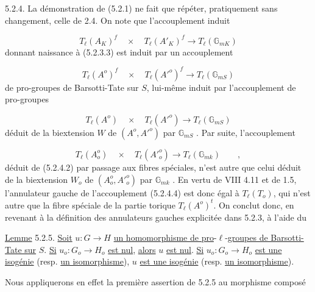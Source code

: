 5.2.4.  La démonstration de (5.2.1) ne fait que répéter, pratiquement sans changement, celle de 2.4. On note que l'accouplement induit

\begin{equation}\tag{5.2.4.1}
T_\ell(A_K)^f \quad \times \quad T_\ell(A'_K)^f \longrightarrow T_\ell(\mathbb{G}_{mK})
\end{equation}
donnant naissance à (5.2.3.3) est induit par un accouplement

\begin{equation}\tag{5.2.4.2}
T_\ell(A^o)^f \quad \times \quad T_\ell({A'}^o)^f \longrightarrow T_\ell(\mathbb{G}_{mS})
\end{equation}
de pro-groupes de Barsotti-Tate sur $S$, lui-même induit par l'accouplement de pro-groupes

\begin{equation}\tag{5.2.4.3}
T_\ell(A^o) \quad \times \quad T_\ell({A'}^o) \longrightarrow T_\ell(\mathbb{G}_{mS})
\end{equation}
déduit de la biextension $W$ de $(A^o,{A'}^o)$ par $\mathbb{G}_{mS}$ . Par suite, l'accouplement

\begin{equation}\tag{5.2.4.4}
T_\ell(A_o^{o}) \quad \times \quad T_\ell({A'}_o^{o}) \longrightarrow T_\ell(\mathbb{G}_{mk}) \qquad ,
\end{equation}
déduit de (5.2.4.2) par passage aux fibres spéciales, n'est autre que celui déduit de la biextension $W_o$ de $(A_o^{o},{A'}_o^{o})$ par $\mathbb{G}_{mk}$ . En vertu de VIII 4.11 et de 1.5, l'annulateur gauche de l'accouplement (5.2.4.4) est donc égal à $T_\ell(T_o)$, qui n'est autre que la fibre spéciale de la partie torique $T_\ell(A^o)^t$. On conclut donc, en revenant à la définition des annulateurs gauches explicitée dans 5.2.3, à l'aide du



\underline{Lemme} 5.2.5. \underline{Soit} $u : G \longrightarrow H$ \underline{un homomorphisme de pro}-$\ell$-\underline{groupes de Barsotti-Tate sur} $S$. \underline{Si} $u_o : G_o \longrightarrow H_o$ \underline{est nul}, \underline{alors} $u$ \underline{est nul}. \underline{Si} $u_o : G_o \longrightarrow H_o$ \underline{est une isogénie} (resp. \underline{un isomorphisme}), $u$ \underline{est une isogénie} (resp. \underline{un isomorphisme}).

Nous appliquerons en effet la première assertion de 5.2.5 au morphisme composé


